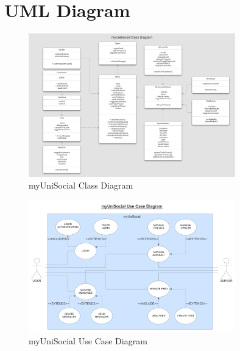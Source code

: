 \documentclass[lettersize,journal]{IEEEtran}
\begin{document}
\section{{UML Diagram}}
\begin{figure}[h!]
	\centering
		\includegraphics[width=0.8\textwidth]{myUniSocialClassDiagram.png}
		\caption{myUniSocial Class Diagram}
		\label{figure 3}

\end{figure}
\begin{figure}[h!]
\centering
 		\includegraphics[width=0.8\textwidth]{myUniSocialUseCaseDiagram.png}
		\caption{myUniSocial Use Case Diagram}
		\label{figure 4}

\end{figure}
\clearpage
\end{document}

